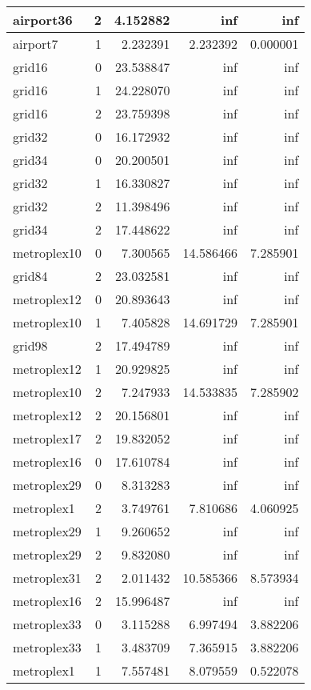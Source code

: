 \documentclass[../../../thesis.tex]{subfiles}
\begin{document}
\begin{longtable}{|l|r|r|r|r|}
\endfoot
\endlastfoot
airport36 & 2 & 4.152882 & inf & inf \\\hline
airport7 & 1 & 2.232391 & 2.232392 & 0.000001 \\\hline
grid16 & 0 & 23.538847 & inf & inf \\\hline
grid16 & 1 & 24.228070 & inf & inf \\\hline
grid16 & 2 & 23.759398 & inf & inf \\\hline
grid32 & 0 & 16.172932 & inf & inf \\\hline
grid34 & 0 & 20.200501 & inf & inf \\\hline
grid32 & 1 & 16.330827 & inf & inf \\\hline
grid32 & 2 & 11.398496 & inf & inf \\\hline
grid34 & 2 & 17.448622 & inf & inf \\\hline
metroplex10 & 0 & 7.300565 & 14.586466 & 7.285901 \\\hline
grid84 & 2 & 23.032581 & inf & inf \\\hline
metroplex12 & 0 & 20.893643 & inf & inf \\\hline
metroplex10 & 1 & 7.405828 & 14.691729 & 7.285901 \\\hline
grid98 & 2 & 17.494789 & inf & inf \\\hline
metroplex12 & 1 & 20.929825 & inf & inf \\\hline
metroplex10 & 2 & 7.247933 & 14.533835 & 7.285902 \\\hline
metroplex12 & 2 & 20.156801 & inf & inf \\\hline
metroplex17 & 2 & 19.832052 & inf & inf \\\hline
metroplex16 & 0 & 17.610784 & inf & inf \\\hline
metroplex29 & 0 & 8.313283 & inf & inf \\\hline
metroplex1 & 2 & 3.749761 & 7.810686 & 4.060925 \\\hline
metroplex29 & 1 & 9.260652 & inf & inf \\\hline
metroplex29 & 2 & 9.832080 & inf & inf \\\hline
metroplex31 & 2 & 2.011432 & 10.585366 & 8.573934 \\\hline
metroplex16 & 2 & 15.996487 & inf & inf \\\hline
metroplex33 & 0 & 3.115288 & 6.997494 & 3.882206 \\\hline
metroplex33 & 1 & 3.483709 & 7.365915 & 3.882206 \\\hline
metroplex1 & 1 & 7.557481 & 8.079559 & 0.522078 \\\hline

\end{longtable}
\end{document}
